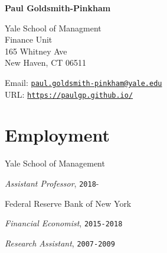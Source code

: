 \documentclass[letterpaper]{article}
\renewenvironment{itemize}{
  \begin{list}{}
    { \setlength{\itemsep}{5pt}
      \setlength{\parsep}{0pt}
      \setlength{\topsep}{0pt}
      \setlength{\leftmargin}{0em} } }{
  \end{list}}
\begin{document}
{\huge\bf  Paul Goldsmith-Pinkham}

\bigskip

Yale School of Managment\\
Finance Unit\\
165 Whitney Ave\\
New Haven, CT 06511
\medskip



Email: \href{mailto:paul.goldsmith-pinkham@yale.edu}{\tt paul.goldsmith-pinkham@yale.edu} \\
URL: \href{http://https://paulgp.github.io//}{\tt https://paulgp.github.io/} 

\section*{Employment}
\begin{itemize}
\item Yale School of Management
  \begin{itemize}
  \item \qquad \textit{Assistant Professor}, \texttt{2018}-
  \end{itemize}  
\item Federal Reserve Bank of New York
  \begin{itemize}
  \item \qquad \textit{Financial Economist}, \texttt{2015-2018}
  \item \qquad \textit{Research Assistant}, \texttt{2007-2009}
  \end{itemize}
\end{itemize}
\end{document}
